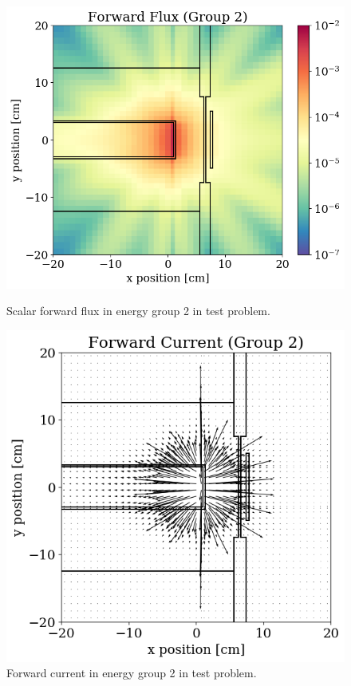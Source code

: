 \begin{figure}
  \begin{minipage}{0.54\linewidth}
    \centering
    \includegraphics[width=\linewidth]{content/testprob/scalar_flux_fwd_g02.png}
    \caption{Scalar forward flux in energy group 2 in test problem.}
    \label{fig:tp:scalar_flux_fwd_g02}
  \end{minipage}
  \hfill
  \begin{minipage}{0.45\linewidth}
    \centering
    \includegraphics[width=\linewidth]{content/testprob/current_fwd_g02.png}
    \caption{Forward current in energy group 2 in test problem.}
    \label{fig:tp:current_fwd_g02}
  \end{minipage}
\end{figure}

